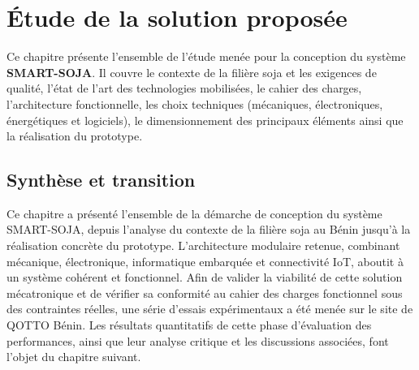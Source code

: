 \chapter{Étude de la solution proposée}

Ce chapitre présente l'ensemble de l'étude menée pour la conception du système \textbf{SMART-SOJA}. Il couvre le contexte de la filière soja et les exigences de qualité, l'état de l'art des technologies mobilisées, le cahier des charges, l'architecture fonctionnelle, les choix techniques (mécaniques, électroniques, énergétiques et logiciels), le dimensionnement des principaux éléments ainsi que la réalisation du prototype.










\section*{Synthèse et transition}
Ce chapitre a présenté l'ensemble de la démarche de conception du système SMART-SOJA, depuis l'analyse du contexte de la filière soja au Bénin jusqu'à la réalisation concrète du prototype. L'architecture modulaire retenue, combinant mécanique, électronique, informatique embarquée et connectivité IoT, aboutit à un système cohérent et fonctionnel. Afin de valider la viabilité de cette solution mécatronique et de vérifier sa conformité au cahier des charges fonctionnel sous des contraintes réelles, une série d'essais expérimentaux a été menée sur le site de QOTTO Bénin. Les résultats quantitatifs de cette phase d'évaluation des performances, ainsi que leur analyse critique et les discussions associées, font l'objet du chapitre suivant.
